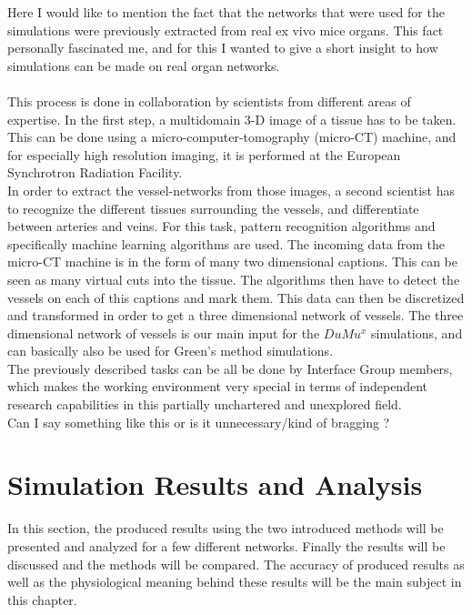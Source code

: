 Here I would like to mention the fact that the networks that were used for the simulations were previously extracted from real ex vivo mice organs. This fact personally fascinated me, and for this I wanted to give a short insight to how simulations can be made on real organ networks.\\
\\This process is done in collaboration by scientists from different areas of expertise. In the first step, a multidomain 3-D image of a tissue has to be taken. This can be done using a micro-computer-tomography (micro-CT) machine, and for especially high resolution imaging, it is performed at the European Synchrotron Radiation Facility.
\\In order to extract the vessel-networks from those images, a second scientist has to recognize the different tissues surrounding the vessels, and differentiate between arteries and veins. For this task, pattern recognition algorithms and specifically machine learning algorithms are used. The incoming data from the micro-CT machine is in the form of many two dimensional captions. This can be seen as many virtual cuts into the tissue. The algorithms then have to detect the vessels on each of this captions and mark them. This data can then be discretized and transformed in order to get a three dimensional network of vessels. The three dimensional network of vessels is our main input for the $DuMu^x$ simulations, and can basically also be used for Green's method simulations.
\\The previously described tasks can be all be done by Interface Group members, which makes the working environment very special in terms of independent research capabilities in this partially unchartered and unexplored field.
\\{\color{red}Can I say something like this or is it unnecessary/kind of bragging ?}

\newpage
\section{Simulation Results and Analysis}
\label{Results}
In this section, the produced results using the two introduced methods will be presented and analyzed for a few different networks. Finally the results will be discussed and the methods will be compared. The accuracy of produced results as well as the physiological meaning behind these results will be the main subject in this chapter.

